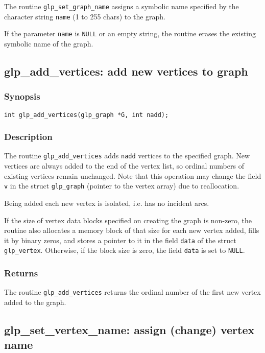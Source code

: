 The routine \verb|glp_set_graph_name| assigns a symbolic name specified
by the character string \verb|name| (1 to 255 chars) to the graph.

If the parameter \verb|name| is \verb|NULL| or an empty string, the
routine erases the existing symbolic name of the graph.

\newpage

\subsection{glp\_add\_vertices: add new vertices to graph}

\subsubsection*{Synopsis}

\begin{verbatim}
int glp_add_vertices(glp_graph *G, int nadd);
\end{verbatim}

\subsubsection*{Description}

The routine \verb|glp_add_vertices| adds \verb|nadd| vertices to the
specified graph. New vertices are always added to the end of the vertex
list, so ordinal numbers of existing vertices remain unchanged. Note
that this operation may change the field \verb|v| in the struct
\verb|glp_graph| (pointer to the vertex array) due to reallocation.

Being added each new vertex is isolated, i.e. has no incident arcs.

If the size of vertex data blocks specified on creating the graph is
non-zero, the routine also allocates a memory block of that size for
each new vertex added, fills it by binary zeros, and stores a pointer to
it in the field \verb|data| of the struct \verb|glp_vertex|. Otherwise,
if the block size is zero, the field \verb|data| is set to \verb|NULL|.

\subsubsection*{Returns}

The routine \verb|glp_add_vertices| returns the ordinal number of the
first new vertex added to the graph.

\subsection{glp\_set\_vertex\_name: assign (change) vertex name}


